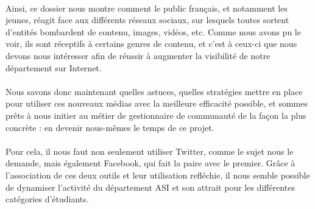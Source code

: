 \paragraph{}
Ainsi, ce dossier nous montre comment le public français, et notamment les jeunes, réagit face aux différents réseaux sociaux, sur lesquels toutes sortent 
d'entités bombardent de contenu, images, vidéos, etc. Comme nous avons pu le voir, ils sont réceptifs à certains genres de contenu, et c'est à ceux-ci que 
nous devons nous intéresser afin de réussir à augmenter la visibilité de notre département sur Internet.

\paragraph{}
Nous savons donc maintenant quelles astuces, quelles stratégies mettre en place pour utiliser ces nouveaux médias avec la meilleure efficacité possible, et 
sommes prêts à nous initier au métier de gestionnaire de communauté de la façon la plus concrète : en devenir nous-mêmes le temps de ce projet.

\paragraph{}
Pour cela, il nous faut non seulement utiliser Twitter, comme le sujet nous le demande, mais également Facebook, qui fait la paire avec le premier. Grâce à 
l'association de ces deux outils et leur utilisation refléchie, il nous semble possible de dynamiser l'activité du département ASI et son attrait pour 
les différentes catégories d'étudiants. 
